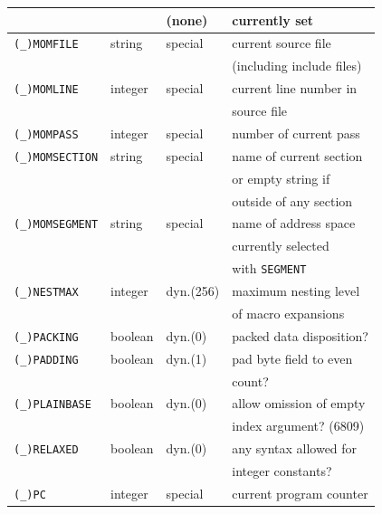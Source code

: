 \documentclass[12pt,twoside]{report}
\newcommand{\tty}[1]{{\tt #1}}
\newcommand{\predefsym}[1]{{\tt (\_)#1}}
\begin{document}
\begin{center}
\begin{longtable}{|l|l|l|l|}
                       &             & (none)     & currently set \\
\hline
\predefsym{MOMFILE}    & string      & special    & current source file \\
                       &             &            & (including include files) \\
\hline
\predefsym{MOMLINE}    & integer     & special    & current line number in  \\
                       &             &            & source file \\
\hline
\predefsym{MOMPASS}    & integer     & special    & number of current pass \\
\hline
\predefsym{MOMSECTION} & string      & special    & name of current section \\
                       &             &            & or empty string if \\
                       &             &            & outside of any section \\
\hline
\predefsym{MOMSEGMENT} & string      & special    & name of address space \\
                       &             &            & currently selected \\
                       &             &            & with \tty{SEGMENT} \\
\hline
\predefsym{NESTMAX}    & integer     & dyn.(256)  & maximum nesting level \\
                       &             &            & of macro expansions \\
\hline
\predefsym{PACKING}    & boolean     & dyn.(0)    & packed data disposition? \\
\hline
\predefsym{PADDING}    & boolean     & dyn.(1)    & pad byte field to even \\
                       &             &            & count? \\
\hline
\predefsym{PLAINBASE}  & boolean     & dyn.(0)    & allow omission of empty \\
                       &             &            & index argument? (6809) \\
\hline
\predefsym{RELAXED}    & boolean     & dyn.(0)    & any syntax allowed for \\
                       &             &            & integer constants? \\
\hline
\predefsym{PC}         & integer     & special    & current program counter \\

\end{longtable}
\end{center}
\end{document}
